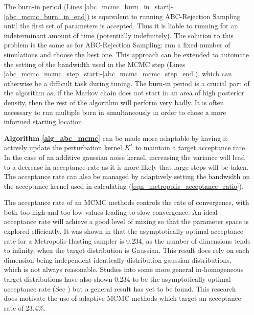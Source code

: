 \documentclass[11pt,a4paper]{article}
\theoremstyle{break}
\begin{document}
  \par The burn-in period (Lines \ref{abc_mcmc_burn_in_start}-\ref{abc_mcmc_burn_in_end}) is equivalent to running ABC-Rejection Sampling until the first set of parameters is accepted. Thus it is liable to running for an indeterminant amount of time (potentially indefinitely). The solution to this problem is the same as for ABC-Rejection Sampling: run a fixed number of simulations and choose the best one. This approach can be extended to automate the setting of the bandwidth used in the MCMC step (Lines \ref{abc_mcmc_mcmc_step_start}-\ref{abc_mcmc_mcmc_step_end}), which can otherwise be a difficult task during tuning. The burn-in period is a crucial part of the algorithm as, if the Markov chain does not start in an area of high posterior density, then the rest of the algorithm will perform very badly. It is often necessary to run multiple burn in simultaneously in order to chose a more informed starting location.

  \par \textbf{Algorithm \ref{alg_abc_mcmc}} can be made more adaptable by having it actively update the perturbation kernel $K^*$ to maintain a target acceptance rate. In the case of an additive gaussian noise kernel, increasing the variance will lead to a decrease in acceptance rate as it is more likely that large steps will be taken. The acceptance rate can also be managed by adaptively setting the bandwidth on the acceptance kernel used in calculating (\ref{eqn_metropolis_acceptance_ratio}).

  \par The acceptance rate of an MCMC methods controls the rate of convergence, with both too high and too low values leading to slow convergence. An ideal acceptance rate will achieve a good level of mixing so that the parameter space is explored efficiently. It was shown in \cite[]{weak_convergence_and_optimal_scaling_of_RWM_algorithms} that the asymptotically optimal acceptance rate for a Metropolis-Hasting sampler is 0.234, as the number of dimensions tends to infinity, when the target distribution is Gaussian. This result does rely on each dimension being independent identically distribution gaussian distributions, which is not always reasonable. Studies into some more general in-homogeneous target distributions have also shown 0.234 to be the asymptotically optimal acceptance rate (See \cite[]{optimal_scaling_for_various_metropolis_hastings_algorithms}) but a general result has yet to be found. This research does motivate the use of adaptive MCMC methods which target an acceptance rate of 23.4\%.
\end{document}
